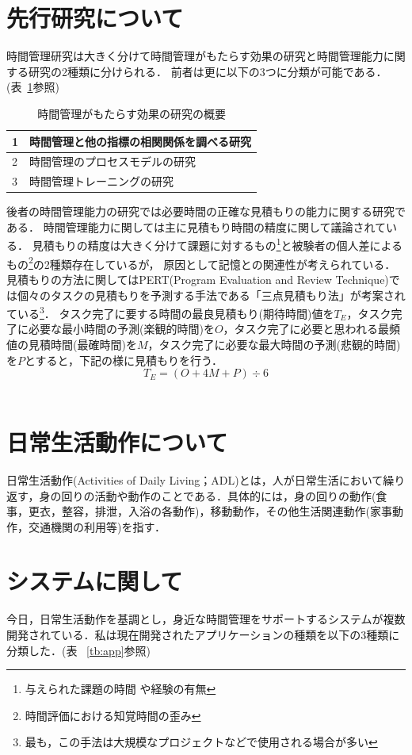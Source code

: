 \section{先行研究について}
時間管理研究は大きく分けて時間管理がもたらす効果の研究と時間管理能力に関する研究の2種類に分けられる．
前者は更に以下の3つに分類が可能である．(表~\ref{tb:senko}参照)
\begin{table}[htb]
\begin{center}
  \begin{tabular}{|l|l|} \hline
   1 & 時間管理と他の指標の相関関係を調べる研究 \\ \hline
   2 & 時間管理のプロセスモデルの研究 \\ \hline
   3 & 時間管理トレーニングの研究 \\ \hline
  \end{tabular}
  \caption{時間管理がもたらす効果の研究の概要}
  \label{tb:senko}
\end{center}
\end{table}

後者の時間管理能力の研究では必要時間の正確な見積もりの能力に関する研究である．
時間管理能力に関しては主に見積もり時間の精度に関して議論されている．
見積もりの精度は大きく分けて課題に対するもの\footnote{与えられた課題の時間 \cite{Roy2008}や経験の有無\cite{Roy2007}}と被験者の個人差によるもの\footnote{時間評価における知覚時間の歪み\cite{Oguro1961}\cite{Murakami2016}}の2種類存在しているが，
原因として記憶との関連性が考えられている\cite{Roy2005}．
見積もりの方法に関してはPERT(Program Evaluation and Review Technique)では個々のタスクの見積もりを予測する手法である「三点見積もり法」が考案されている\footnote{最も，この手法は大規模なプロジェクトなどで使用される場合が多い}．
タスク完了に要する時間の最良見積もり(期待時間)値を$T_{E}$，タスク完了に必要な最小時間の予測(楽観的時間)を$O$，タスク完了に必要と思われる最頻値の見積時間(最確時間)を$M$，タスク完了に必要な最大時間の予測(悲観的時間)を$P$とすると，下記の様に見積もりを行う．
\[ 
T_{E} = (O + 4M + P) ÷ 6
\]　

\section{日常生活動作について}
日常生活動作(Activities of Daily Living；ADL)とは，人が日常生活において繰り返す，身の回りの活動や動作のことである．具体的には，身の回りの動作(食事，更衣，整容，排泄，入浴の各動作)，移動動作，その他生活関連動作(家事動作，交通機関の利用等)を指す\cite{Sakai2003}．

\section{システムに関して}
今日，日常生活動作を基調とし，身近な時間管理をサポートするシステムが複数開発されている．私は現在開発されたアプリケーションの種類を以下の3種類に分類した．(表 ~\ref{tb:app}参照)

